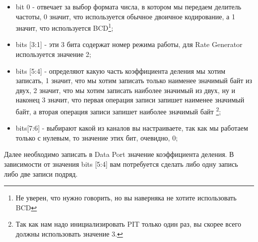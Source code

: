 \begin{itemize}
  \item bit 0 - отвечает за выбор формата числа, в котором мы передаем делитель
        частоты, 0 значит, что используется обычное двоичное кодирование, а
        1 значит, что используется BCD\footnote{Не уверен, что нужно говорить,
        но вы наверняка не хотите использовать BCD};
  \item bits [3:1] - эти 3 бита содержат номер режима работы, для Rate Generator
        используется значение 2;
  \item bits [5:4] - определяют какую часть коэффициента деления мы хотим
        записать, 1 значит, что мы хотим записать только наименее значимый байт
        из двух, 2 значит, что мы хотим записать наиболее значимый из двух, ну
        и наконец 3 значит, что первая операция записи запишет наименее
        значимый байт, а вторая операция записи запишет наиболее значимый байт
        \footnote{Так как нам надо инициализировать PIT только один раз, вы
        скорее всего должны использовать значение 3.};
  \item bits[7:6] - выбирают какой из каналов вы настраиваете, так как мы
        работаем только с нулевым, то значение этих бит, очевидно, 0;
\end{itemize}

Далее необходимо записать в Data Port значение коэффициента деления. В
зависимости от значения bits [5:4] вам потребуется сделать либо одну запись
либо две записи подряд.
